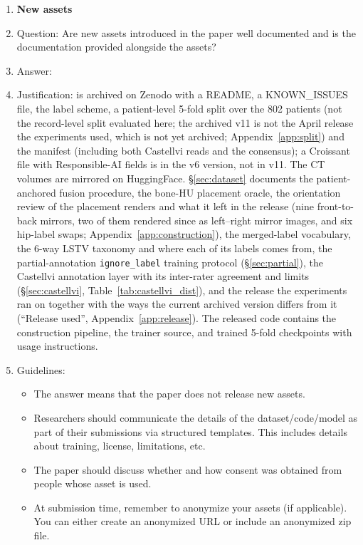 \begin{enumerate}
\item {\bf New assets}
    \item[] Question: Are new assets introduced in the paper well documented and is the documentation provided alongside the assets?
    \item[] Answer: \answerYes{}
    \item[] Justification: \dataset{} is archived on Zenodo with a README, a KNOWN\_ISSUES file, the label scheme, a patient-level 5-fold split over the 802 patients (not the record-level split evaluated here; the archived v11 is not the April release the experiments used, which is not yet archived; Appendix~\ref{app:split}) and the manifest (including both Castellvi reads and the consensus); a Croissant file with Responsible-AI fields is in the v6 version, not in v11. The CT volumes are mirrored on HuggingFace. \S\ref{sec:dataset} documents the patient-anchored fusion procedure, the bone-HU placement oracle, the orientation review of the placement renders and what it left in the release (nine front-to-back mirrors, two of them rendered since as left--right mirror images, and six hip-label swaps; Appendix~\ref{app:construction}), the merged-label vocabulary, the 6-way LSTV taxonomy and where each of its labels comes from, the partial-annotation \texttt{ignore\_label} training protocol (\S\ref{sec:partial}), the Castellvi annotation layer with its inter-rater agreement and limits (\S\ref{sec:castellvi}, Table~\ref{tab:castellvi_dist}), and the release the experiments ran on together with the ways the current archived version differs from it (``Release used'', Appendix~\ref{app:release}). The released code contains the construction pipeline, the trainer source, and trained 5-fold checkpoints with usage instructions.
    \item[] Guidelines:
    \begin{itemize}
        \item The answer \answerNA{} means that the paper does not release new assets.
        \item Researchers should communicate the details of the dataset\slash code\slash model as part of their submissions via structured templates. This includes details about training, license, limitations, etc.
        \item The paper should discuss whether and how consent was obtained from people whose asset is used.
        \item At submission time, remember to anonymize your assets (if applicable). You can either create an anonymized URL or include an anonymized zip file.
    \end{itemize}


\end{enumerate}
